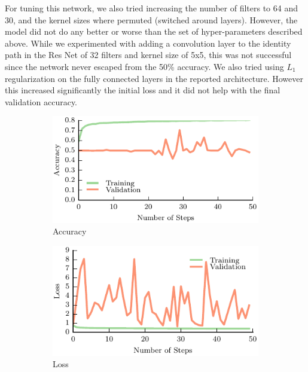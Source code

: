 For tuning this network, we also tried increasing the number of filters to 64 and 30, and the kernel sizes where permuted (switched around layers). 
However, the model did not do any better or worse than the set of hyper-parameters described above. 
While we experimented with adding a convolution layer to the identity path in the Res Net of 32 filters and kernel size of 5x5, this was not successful since the network never escaped from the 50\% accuracy. 
We also tried using $L_{1}$ regularization on the fully connected layers in the reported architecture. 
However this increased significantly the initial loss and it did not help with the final validation accuracy.

\begin{figure}[t!]
    \centering
    \begin{subfigure}[t]{0.32\textwidth}
        \includegraphics[width=0.9\columnwidth]{figs/res_net_accuracy.pdf}
        \caption{Accuracy} \label{fig:accuracy_res}
        \end{subfigure}
    \begin{subfigure}[t]{0.32\textwidth}
        \includegraphics[width=0.9\columnwidth]{figs/res_net_loss.pdf}
        \caption{Loss} \label{fig:loss_res}
    \end{subfigure}
		\begin{subfigure}[t]{0.32\textwidth}

\end{subfigure}
\end{figure}
